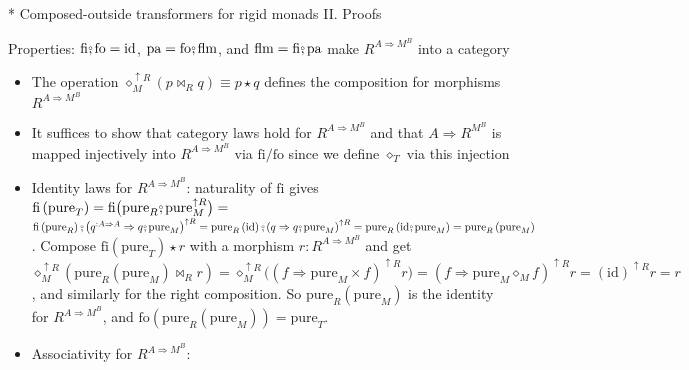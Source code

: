 \documentclass[english]{beamer}
\newcommand{\bef}{\ensuremath\raisebox{2pt}{$\mathsmaller{\mathsmaller{\circ}}$}\hspace{-3.3pt},}
\begin{document}
\begin{frame}{{*} Composed-outside transformers for rigid monads II. Proofs}

{\footnotesize{}\vspace{-0.15cm}Properties: $\text{fi}\bef\text{fo}=\text{id}$,
$\text{pa}=\text{fo}\bef\text{flm}$, and $\text{flm}=\text{fi}\bef\text{pa}$
make $R^{A\Rightarrow M^{B}}$ into a category}{\footnotesize\par}
\begin{itemize}
\item {\footnotesize{}\vspace{-0.2cm}The operation $\diamond_{M}^{\uparrow R}\left(p\bowtie_{R}q\right)\equiv p\star q$
defines the composition for morphisms $R^{A\Rightarrow M^{B}}$}{\footnotesize\par}
\item {\footnotesize{}\vspace{-0.1cm}It suffices to show that category
laws hold for $R^{A\Rightarrow M^{B}}$ and that $A\Rightarrow R^{M^{B}}$
is mapped injectively into $R^{A\Rightarrow M^{B}}$ via $\text{fi}/\text{fo}$
since we define $\diamond_{T}$ via this injection}{\footnotesize\par}
\item {\footnotesize{}\vspace{-0.1cm}Identity laws for $R^{A\Rightarrow M^{B}}$:
naturality of $\text{fi}$ gives $\text{fi}\left(\text{pure}_{T}\right)=\text{fi}\big(\text{pure}_{R}\bef\text{pure}_{M}^{\uparrow R}\big)=$
$\text{fi}\left(\text{pure}_{R}\right)\bef\left(q^{:A\Rightarrow A}\Rightarrow q\bef\text{pure}_{M}\right)^{\uparrow R}=\text{pure}_{R}\left(\text{id}\right)\bef\left(q\Rightarrow q\bef\text{pure}_{M}\right)^{\uparrow R}=\text{pure}_{R}\left(\text{id}\bef\text{pure}_{M}\right)=\text{pure}_{R}\left(\text{pure}_{M}\right)$.
Compose $\text{fi}\left(\text{pure}_{T}\right)\star r$ with a morphism
$r:R^{A\Rightarrow M^{B}}$ and get $\diamond_{M}^{\uparrow R}\left(\text{pure}_{R}(\text{pure}_{M})\bowtie_{R}r\right)=\diamond_{M}^{\uparrow R}\big(\left(f\Rightarrow\text{pure}_{M}\times f\right)^{\uparrow R}r\big)=\left(f\Rightarrow\text{pure}_{M}\diamond_{M}f\right)^{\uparrow R}r=\left(\text{id}\right)^{\uparrow R}r=r$,
and similarly for the right composition. So $\text{pure}_{R}\left(\text{pure}_{M}\right)$
is the identity for $R^{A\Rightarrow M^{B}}$, and $\text{fo}\left(\text{pure}_{R}\left(\text{pure}_{M}\right)\right)=\text{pure}_{T}$. }{\footnotesize\par}
\item {\footnotesize{}\vspace{-0.1cm}Associativity for $R^{A\Rightarrow M^{B}}$:
}
\end{itemize}
\end{frame}
\end{document}
